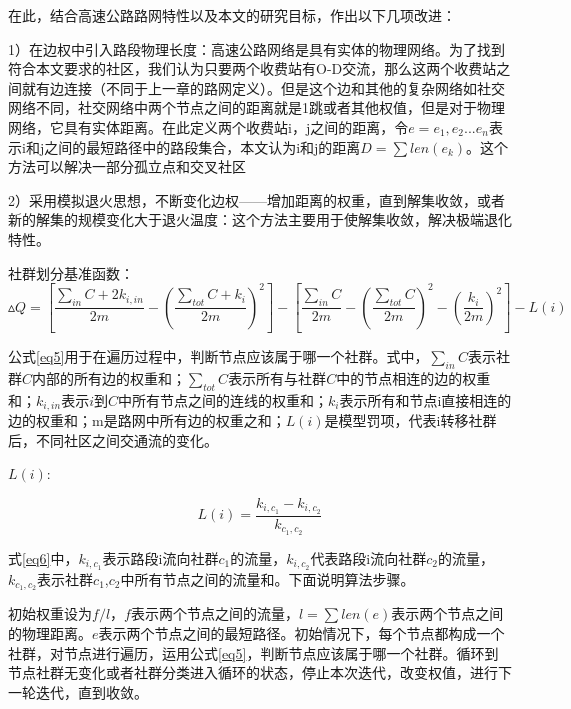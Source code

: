		在此，结合高速公路路网特性以及本文的研究目标，作出以下几项改进：

		1）在边权中引入路段物理长度：高速公路网络是具有实体的物理网络。为了找到符合本文要求的社区，我们认为只要两个收费站有O-D交流，那么这两个收费站之间就有边连接（不同于上一章的路网定义）。但是这个边和其他的复杂网络如社交网络不同，社交网络中两个节点之间的距离就是1跳或者其他权值，但是对于物理网络，它具有实体距离。在此定义两个收费站i，j之间的距离，令$e={e_1,e_2...e_n}$表示i和j之间的最短路径中的路段集合，本文认为i和j的距离$D=\sum {len(e_k)}$。这个方法可以解决一部分孤立点和交叉社区

		2）采用模拟退火思想，不断变化边权——增加距离的权重，直到解集收敛，或者新的解集的规模变化大于退火温度：这个方法主要用于使解集收敛，解决极端退化特性。

		社群划分基准函数：
		\begin{equation}
		\vartriangle Q = [\frac{{\sum_{in} C  + 2{k_{i,in}}}}{{2m}} - {(\frac{{\sum_{tot} C  + {k_i}}}{{2m}})^2}] - [\frac{{\sum_{in} C }}{{2m}} - {(\frac{{\sum_{tot} C }}{{2m}})^2} - {(\frac{{{k_i}}}{{2m}})^2}] - L(i)
		\label{eq5}
		\end{equation}

		公式\ref{eq5}用于在遍历过程中，判断节点应该属于哪一个社群。式中，$\sum_{in} C$表示社群$C$内部的所有边的权重和；$\sum_{tot} C$表示所有与社群$C$中的节点相连的边的权重和；$k_{i,in}$表示$i$到$C$中所有节点之间的连线的权重和；$k_i$表示所有和节点i直接相连的边的权重和；m是路网中所有边的权重之和；$L(i)$是模型罚项，代表i转移社群后，不同社区之间交通流的变化。

		$L(i)$:

		\begin{equation}
		L(i)=\frac{{{k_{i,{c_1}}} - {k_{i,{c_2}}}}}{{{k_{{c_1},{c_2}}}}}
		\label{eq6}
		\end{equation}

		式\ref{eq6}中，${k_{i,{c_1}}}$表示路段i流向社群$c_1$的流量，$k_{i,{c_2}}$代表路段i流向社群$c_2$的流量，${{{k_{{c_1},{c_2}}}}}$表示社群$c_1$,$c_2$中所有节点之间的流量和。下面说明算法步骤。

		初始权重设为$f/l$，$f$表示两个节点之间的流量，$l=\sum {len(e)}$表示两个节点之间的物理距离。$e$表示两个节点之间的最短路径。初始情况下，每个节点都构成一个社群，对节点进行遍历，运用公式\ref{eq5}，判断节点应该属于哪一个社群。循环到节点社群无变化或者社群分类进入循环的状态，停止本次迭代，改变权值，进行下一轮迭代，直到收敛。

